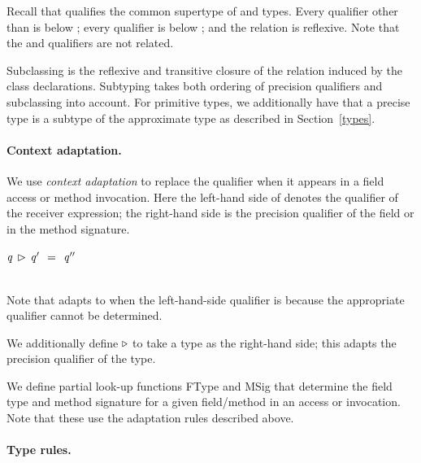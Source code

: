 \noindent
Recall that \top{} qualifies the common supertype of \precise{} and
\approx{} types.
Every qualifier other than \top{} is below \lost{};
every qualifier is below \top{}; and the relation is
reflexive.
Note that the \precise{} and \approx{} qualifiers are not
related.

Subclassing is the reflexive and transitive closure of the relation
induced by the class declarations.
Subtyping takes both ordering of precision qualifiers and subclassing
into account.
For primitive types, we additionally have that a precise type is a
subtype of the approximate type as described in Section~\ref{types}.


\paragraph{Context adaptation.}

We use \emph{context adaptation} to replace the \context{} qualifier
when it appears in a field
access or method invocation. Here the left-hand side
of \comb{} denotes the qualifier of the receiver expression;
the right-hand side is the precision qualifier of the field or in the method
signature.

\vspace{0.5ex}
\noindent
\begin{ottdefnblock}[#1]{$ \ottnt{q} \, \rhd\,  \ottnt{q'} \ \  \textsf{=} \ \  \ottnt{q''} $}{}
\ottusedrule{\hfill \ottdruleqcqXXcontext{} \hfill}\\[2mm]
\ottusedrule{\ottdruleqcqXXlost{} \hfill
\ottdruleqcqXXfixed{}\ \ }\\
\end{ottdefnblock}

\noindent
Note that \context{} adapts to \lost{} when the left-hand-side qualifier
is \top{} because the appropriate qualifier cannot be determined.

We additionally define $\triangleright$ to take a type as the
right-hand side; this adapts the precision qualifier of the type.


We define partial look-up functions FType and MSig that determine the field
type and method signature for a given field/method in an access or
invocation.
Note that these use the adaptation rules described above.


\paragraph{Type rules.}

